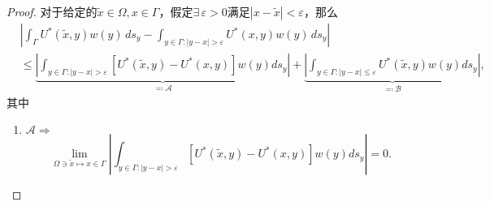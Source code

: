 \begin{proof}
  对于给定的$\widetilde{x} \in \Omega, x \in \Gamma$，假定$\exists \, \varepsilon >0$满足$\left| x - \widetilde{x} \right| < \varepsilon$，那么
  \begin{equation}
    \label{eq:bvp-single-layer-gen-sing-suf-integral}
    \begin{split}
  &\left|
  \int_{\Gamma} U^{*}(\widetilde{x}, y) w(y) \, d s_y -
  \int_{y \in \Gamma: \left| y - x \right| > \varepsilon} U^{*}(x,y) w(y) \, d s_y
  \right| \\
  &\le
   \underbrace{
   \left|
   \int_{y \in \Gamma: \left| y - x \right| > \varepsilon}
   \left[ U^{*}(\widetilde{x}, y) - U^{*}(x, y) \right]
   w(y) d s_y
   \right|
   }_{\eqqcolon \mathcal{A}}
   + \underbrace{
   \left|
   \int_{y \in \Gamma: \left| y - x \right| \le \varepsilon}
   U^{*}(\widetilde{x}, y) w(y) d s_y
   \right|
   }_{\eqqcolon \mathcal{B}},
  \end{split}
  \end{equation}
  其中
  \begin{enumerate}
  \item $\mathcal{A} \Rightarrow$
  \begin{equation*}
  \lim_{\Omega \ni \widetilde{x} \mapsto x \in \Gamma}
  \left|
  \int_{y \in \Gamma: \left| y - x \right| > \varepsilon}
  \left[ U^{*}(\widetilde{x}, y) - U^{*}(x, y) \right]
  w(y) d s_y
  \right|
  = 0.
  \end{equation*}


\end{enumerate}
\end{proof}
